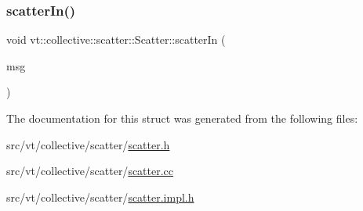 \mbox{\label{structvt_1_1collective_1_1scatter_1_1_scatter_aa80a957377cce3126058f3d7d30d2fed}} 
\subsubsection{\texorpdfstring{scatter\+In()}{scatterIn()}}
{\footnotesize\ttfamily void vt\+::collective\+::scatter\+::\+Scatter\+::scatter\+In (\begin{DoxyParamCaption}\item[{\hyperlink{structvt_1_1collective_1_1scatter_1_1_scatter_msg}{Scatter\+Msg} $\ast$}]{msg }\end{DoxyParamCaption})\hspace{0.3cm}{\ttfamily [protected]}}



The documentation for this struct was generated from the following files\+:\begin{DoxyCompactItemize}
\item 
src/vt/collective/scatter/\hyperlink{scatter_8h}{scatter.\+h}\item 
src/vt/collective/scatter/\hyperlink{scatter_8cc}{scatter.\+cc}\item 
src/vt/collective/scatter/\hyperlink{scatter_8impl_8h}{scatter.\+impl.\+h}\end{DoxyCompactItemize}
